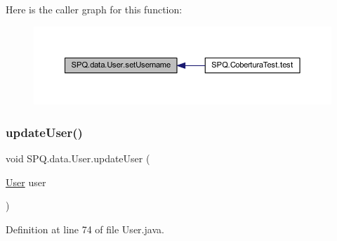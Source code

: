 Here is the caller graph for this function\+:\nopagebreak
\begin{figure}[H]
\begin{center}
\leavevmode
\includegraphics[width=350pt]{class_s_p_q_1_1data_1_1_user_ab173655f6fbe57a59cd0da8d0cfbed06_icgraph}
\end{center}
\end{figure}
\mbox{\label{class_s_p_q_1_1data_1_1_user_ac472400b9deed770cf6f3591dc9e2886}} 
\subsubsection{\texorpdfstring{update\+User()}{updateUser()}}
{\footnotesize\ttfamily void S\+P\+Q.\+data.\+User.\+update\+User (\begin{DoxyParamCaption}\item[{\mbox{\hyperlink{class_s_p_q_1_1data_1_1_user}{User}}}]{user }\end{DoxyParamCaption})}



Definition at line 74 of file User.\+java.

